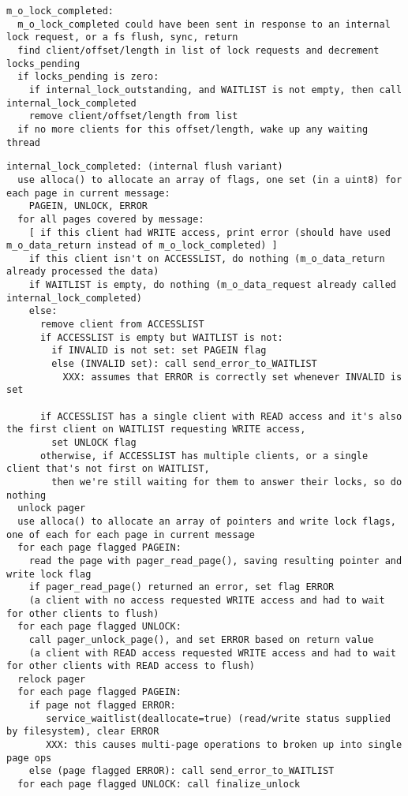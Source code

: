 \documentclass{article}
\begin{document}
\begin{verbatim}
m_o_lock_completed:
  m_o_lock_completed could have been sent in response to an internal lock request, or a fs flush, sync, return
  find client/offset/length in list of lock requests and decrement locks_pending
  if locks_pending is zero:
    if internal_lock_outstanding, and WAITLIST is not empty, then call internal_lock_completed
    remove client/offset/length from list
  if no more clients for this offset/length, wake up any waiting thread
\end{verbatim}

\begin{verbatim}
internal_lock_completed: (internal flush variant)
  use alloca() to allocate an array of flags, one set (in a uint8) for each page in current message:
    PAGEIN, UNLOCK, ERROR
  for all pages covered by message:
    [ if this client had WRITE access, print error (should have used m_o_data_return instead of m_o_lock_completed) ]
    if this client isn't on ACCESSLIST, do nothing (m_o_data_return already processed the data)
    if WAITLIST is empty, do nothing (m_o_data_request already called internal_lock_completed)
    else:
      remove client from ACCESSLIST
      if ACCESSLIST is empty but WAITLIST is not:
        if INVALID is not set: set PAGEIN flag
        else (INVALID set): call send_error_to_WAITLIST
          XXX: assumes that ERROR is correctly set whenever INVALID is set

      if ACCESSLIST has a single client with READ access and it's also the first client on WAITLIST requesting WRITE access,
        set UNLOCK flag
      otherwise, if ACCESSLIST has multiple clients, or a single client that's not first on WAITLIST,
        then we're still waiting for them to answer their locks, so do nothing
  unlock pager
  use alloca() to allocate an array of pointers and write lock flags, one of each for each page in current message
  for each page flagged PAGEIN:
    read the page with pager_read_page(), saving resulting pointer and write lock flag
    if pager_read_page() returned an error, set flag ERROR
    (a client with no access requested WRITE access and had to wait for other clients to flush)
  for each page flagged UNLOCK:
    call pager_unlock_page(), and set ERROR based on return value
    (a client with READ access requested WRITE access and had to wait for other clients with READ access to flush)
  relock pager
  for each page flagged PAGEIN:
    if page not flagged ERROR:
       service_waitlist(deallocate=true) (read/write status supplied by filesystem), clear ERROR
       XXX: this causes multi-page operations to broken up into single page ops
    else (page flagged ERROR): call send_error_to_WAITLIST
  for each page flagged UNLOCK: call finalize_unlock
\end{verbatim}
\end{document}
